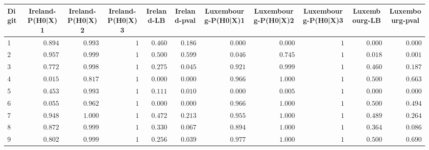 \begin{table}[!tbp]
\begin{center}
\begin{tabular}{lrrrrrrrrrr}
\hline\hline
\multicolumn{1}{l}{Digit}&\multicolumn{1}{c}{Ireland-P(H0|X)1}&\multicolumn{1}{c}{Ireland-P(H0|X)2}&\multicolumn{1}{c}{Ireland-P(H0|X)3}&\multicolumn{1}{c}{Ireland-LB}&\multicolumn{1}{c}{Ireland-pval}&\multicolumn{1}{c}{Luxembourg-P(H0|X)1}&\multicolumn{1}{c}{Luxembourg-P(H0|X)2}&\multicolumn{1}{c}{Luxembourg-P(H0|X)3}&\multicolumn{1}{c}{Luxembourg-LB}&\multicolumn{1}{c}{Luxembourg-pval}\tabularnewline
\hline
1&$0.894$&$0.993$&$1$&$0.460$&$0.186$&$0.000$&$0.000$&$1$&$0.000$&$0.000$\tabularnewline
2&$0.957$&$0.999$&$1$&$0.500$&$0.599$&$0.046$&$0.745$&$1$&$0.018$&$0.001$\tabularnewline
3&$0.772$&$0.998$&$1$&$0.275$&$0.045$&$0.921$&$0.999$&$1$&$0.460$&$0.187$\tabularnewline
4&$0.015$&$0.817$&$1$&$0.000$&$0.000$&$0.966$&$1.000$&$1$&$0.500$&$0.663$\tabularnewline
5&$0.453$&$0.993$&$1$&$0.111$&$0.010$&$0.000$&$0.005$&$1$&$0.000$&$0.000$\tabularnewline
6&$0.055$&$0.962$&$1$&$0.000$&$0.000$&$0.966$&$1.000$&$1$&$0.500$&$0.494$\tabularnewline
7&$0.948$&$1.000$&$1$&$0.472$&$0.213$&$0.955$&$1.000$&$1$&$0.489$&$0.264$\tabularnewline
8&$0.872$&$0.999$&$1$&$0.330$&$0.067$&$0.894$&$1.000$&$1$&$0.364$&$0.086$\tabularnewline
9&$0.802$&$0.999$&$1$&$0.256$&$0.039$&$0.977$&$1.000$&$1$&$0.500$&$0.690$\tabularnewline
\hline
\end{tabular}\end{center}
\end{table}
